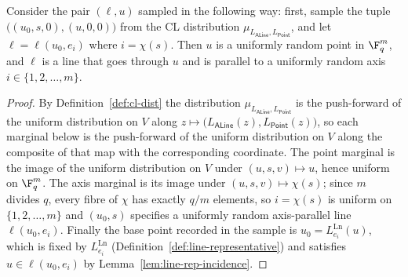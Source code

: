 \begin{lemma}\label{lem:alnf}
	\leanok
	Consider the pair $(\ell, u)$ sampled in the following way: first, sample the tuple $\bigl((u_0,s,0),(u,0,0)\bigr)$ from the CL distribution $\mu_{L_{\mathsf{ALine}}, L_{\mathsf{Point}}}$, and let $\ell = \ell(u_0, e_i)$ where $i = \chi(s)$. Then $u$ is a uniformly random point in $\F_q^m$, and $\ell$ is a line that goes through $u$ and is parallel to a uniformly random axis $i \in \{1,2,\ldots,m\}$.
\end{lemma}
\begin{proof}
	\leanok
	By Definition~\ref{def:cl-dist} the distribution $\mu_{L_{\mathsf{ALine}}, L_{\mathsf{Point}}}$ is the push-forward of the uniform distribution on $V$ along $z \mapsto \bigl(L_{\mathsf{ALine}}(z), L_{\mathsf{Point}}(z)\bigr)$, so each marginal below is the push-forward of the uniform distribution on $V$ along the composite of that map with the corresponding coordinate. The point marginal is the image of the uniform distribution on $V$ under $(u,s,v) \mapsto u$, hence uniform on $\F_q^m$. The axis marginal is its image under $(u,s,v) \mapsto \chi(s)$; since $m$ divides $q$, every fibre of $\chi$ has exactly $q/m$ elements, so $i = \chi(s)$ is uniform on $\{1,2,\ldots,m\}$ and $(u_0,s)$ specifies a uniformly random axis-parallel line $\ell(u_0,e_i)$. Finally the base point recorded in the sample is $u_0 = L^{\mathrm{Ln}}_{e_i}(u)$, which is fixed by $L^{\mathrm{Ln}}_{e_i}$ (Definition~\ref{def:line-representative}) and satisfies $u \in \ell(u_0,e_i)$ by Lemma~\ref{lem:line-rep-incidence}.
\end{proof}


